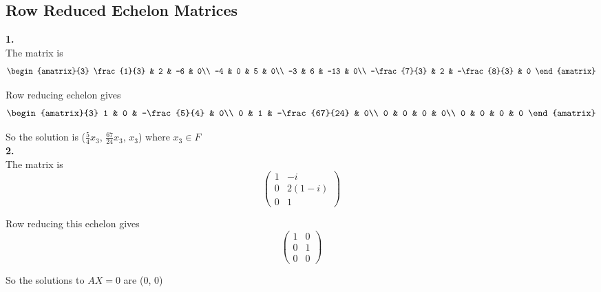 \documentclass[11pt]{article}
\begin{document}
\subsection{Row Reduced Echelon Matrices}
\textbf{1.}\\

The matrix is
\[
  \begin{amatrix}{3}
    \frac{1}{3} & 2 & -6 & 0\\
    -4 & 0 & 5 & 0\\
    -3 & 6 & -13 & 0\\
    -\frac{7}{3} & 2 & -\frac{8}{3} & 0
  \end{amatrix}
\]

Row reducing echelon gives
\[
  \begin{amatrix}{3}
    1 & 0 & -\frac{5}{4} & 0\\
    0 & 1 & -\frac{67}{24} & 0\\
    0 & 0 & 0 & 0\\
    0 & 0 &  0 & 0
  \end{amatrix}
\]

So the solution is ($\frac{5}{4}x_3$, $\frac{67}{24}x_3$, $x_3$) where $x_3 \in F$\\

\textbf{2.}\\

The matrix is
\[
  \begin{pmatrix}
    1 & -i\\
    0 & 2(1 - i)\\
    0 & 1
  \end{pmatrix}
\]

Row reducing this echelon gives
\[
  \begin{pmatrix}
    1 & 0\\
    0 & 1\\
    0 & 0
  \end{pmatrix}
\]

So the solutions to $AX = 0$ are ($0$, $0$)
\end{document}
